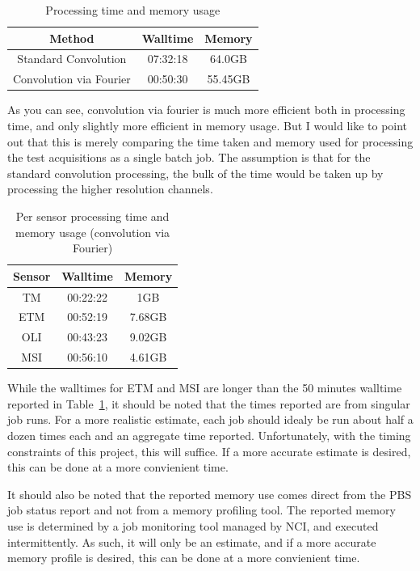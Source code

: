 \documentclass[a4paper]{article}
\begin{document}
    \begin{table}[ht!]
      \caption{Processing time and memory usage}\label{table:1}
      \centering
      \begin{tabular}{ccc} \midrule
        \textbf{Method} & \textbf{Walltime} & \textbf{Memory} \\ \midrule
        Standard Convolution & 07:32:18 & 64.0GB \\
        Convolution via Fourier & 00:50:30 & 55.45GB \\ \midrule
      \end{tabular}
    \end{table}

    \begin{flushleft}
      As you can see, convolution via fourier is much more efficient both in processing time, and only slightly more efficient in memory usage. But I would like to point out that this is merely comparing the time taken and memory used for processing the test acquisitions as a single batch job. The assumption is that for the standard convolution processing, the bulk of the time would be taken up by processing the higher resolution channels.
    \end{flushleft}

    \begin{table}[ht!]
      \caption{Per sensor processing time and memory usage (convolution via Fourier)}\label{table:2}
      \centering
      \begin{tabular}{ccc} \midrule
        \textbf{Sensor} & \textbf{Walltime} & \textbf{Memory} \\ \midrule
        TM & 00:22:22 & 1GB \\
        ETM & 00:52:19 & 7.68GB \\
        OLI & 00:43:23 & 9.02GB \\
        MSI & 00:56:10 & 4.61GB \\ \midrule
      \end{tabular}
    \end{table}

    \begin{flushleft}
      While the walltimes for ETM and MSI are longer than the 50 minutes walltime reported in Table~\ref{table:1}, it should be noted that the times reported are from singular job runs. For a more realistic estimate, each job should idealy be run about half a dozen times each and an aggregate time reported. Unfortunately, with the timing constraints of this project, this will suffice. If a more accurate estimate is desired, this can be done at a more convienient time. \par
      It should also be noted that the reported memory use comes direct from the PBS job status report and not from a memory profiling tool. The reported memory use is determined by a job monitoring tool managed by NCI, and executed intermittently. As such, it will only be an estimate, and if a more accurate memory profile is desired, this can be done at a more convienient time.
    \end{flushleft}
\end{document}
